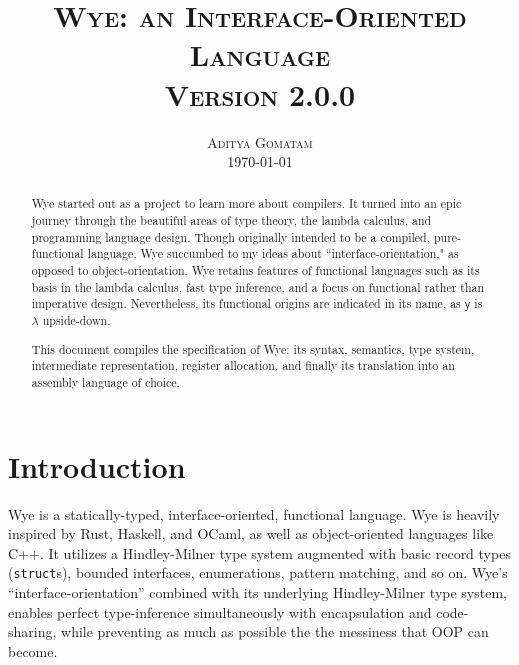 \documentclass[a4paper, 12pt]{article}
\newcommand{\version}{2.0.0}
\renewcommand{\tt}{\texttt}
\begin{document}
\title{
\textsc{Wye: an Interface-Oriented Language} \\
\vspace{2ex}
\large{\textsc{Version \version}}\\
\vspace{2ex}}

\author{\normalsize\textsc{Aditya Gomatam} \\ 
\normalsize{\today\vspace{2ex}}}
\date{}
\maketitle


\begin{abstract}
Wye started out as a project to learn more about compilers. It turned into an
epic journey through the beautiful areas of type theory, the lambda calculus,
and programming language design. Though originally intended to be a compiled,
pure-functional language, Wye succumbed to my ideas about
``interface-orientation," as opposed to object-orientation. Wye retains features
of functional languages such as its basis in the lambda calculus, fast type
inference, and a focus on functional rather than imperative design.
Nevertheless, its functional origins are indicated in its name, as $\mathsf{y}$
is $\lambda$ upside-down.

This document compiles the specification of Wye: its syntax, semantics, type
system, intermediate representation, register allocation, and finally its
translation into an assembly language of choice.
\end{abstract}

\section{Introduction}
Wye is a statically-typed, interface-oriented, functional language. Wye is
heavily inspired by Rust, Haskell, and OCaml, as well as object-oriented
languages like C++. It utilizes a Hindley-Milner type system augmented with
basic record types (\tt{struct}s), bounded interfaces, enumerations, pattern
matching, and so on. Wye's ``interface-orientation'' combined with its
underlying Hindley-Milner type system, enables perfect type-inference
simultaneously with encapsulation and code-sharing, while preventing as much as
possible the the messiness that OOP can become.
\end{document}
